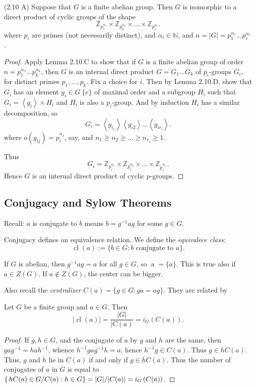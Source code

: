 \begin{theorem}
	(2.10 A)
	Suppose that $G$ is a finite abelian group. Then $G$ is isomorphic to a direct product of cyclic groups of the shape \[
		\mathbb{Z}_{p_1^{\alpha_1}}\times \mathbb{Z}_{p_2^{\alpha_2}}\times\ldots \times  \mathbb{Z}_{p_r^{\alpha_r}}
	.\] 
	where $p_i$ are primes (not necessarily distinct), and $\alpha_i \in \mathbb{N}$, and $n = |G| = p_1^{\alpha_1} \ldots p_r^{\alpha_r}$.
\end{theorem}
\begin{proof}
	Apply Lemma 2.10.C to show that if $G$ is a finite abelian group of order $n = p_1^{\alpha_1}\ldots p_k^{\alpha_k}$, then $G$ is an internal direct product $G = G_1 \ldots G_k$ of $p_i$-groups $G_i$, for distinct primes $p_1,\ldots,p_k$. Fix a choice for $i$. Then by Lemma 2.10.D, show that $G_i$ has an element $g_i \in G \ \{e\} $ of maximal order and a subgroup $H_i$ such that $G_i = \left\langle g_i \right\rangle \times H_i$ and $H_i$ is also a $p_i$-group. And by induction $H_i$ has a similar decomposition, so
	\[
		G_i = \left\langle g_{i_1} \right\rangle \left\langle g_{i 2} \right\rangle \ldots \left\langle g_{ir_i} \right\rangle 
	.\] 
	where $o(g_{ij}) = p_i^{n_j}$, say, and $n_1 \ge n_2 \ge  \ldots \ge n_{r_i} \ge 1$.
	
	Thus  \[
		G_i = \mathbb{Z}_{p_i^{n_1}}\times 
\mathbb{Z}_{p_i^{n_2}}\times  \ldots \times 
\mathbb{Z}_{p_i^{n_{r_i}}}
	.\] 
	Hence $G$ is an internal direct product of cyclic $p$-groups.
\end{proof}

\subsection{Conjugacy and Sylow Theorems}

Recall: $a$ is conjugate to $b$ means $b = g^{-1} ag $ for some $g \in G$.

Conjugacy defines an equivalence relation. We define the \textit{equivalece class}:
\[
	\operatorname{cl}(a):= \{b \in G: b \text{ conjugate to }a\} 
.\] 

If $G$ is abelian, then $g^{-1} ag = a$ for all $g \in G$, so $\operatorname{a} = \{a\} $. This is true also if $a \in Z(G)$. If $a \not\in Z(G)$, the center can be bigger.

Also recall the \textit{centralizer} $C(a) = \{g \in G: ga = ag \} $. They are related by
\begin{theorem}
	Let $G$ be a finite group and $a \in G$. Then
	\[
		|\operatorname{cl}(a)| = \frac{|G|}{|C(a)}=i_G\left( C(a) \right)
	.\]
\end{theorem}
\begin{proof}
	If $g, h \in G$, and the conjugate of  $a$ by $g$ and $h$ are the same, then $g a g^{-1} = h a h^{-1} $, whence $h^{-1} g a g^{-1} h = a$, hence $h^{-1} g \in C(a)$. Thus $g \in hC(a)$. Thus, $g$ and $h$ lie in $C(a)$ if and only if $g \in h C(a)$. Thus the number of conjugates of $a $ in $G$ is equal to $\operatorname \{h C(a) \in G / C(a) : h \in G\} = |G| / |C(a)| = i_G\left( C(a) \right) $.
\end{proof}

